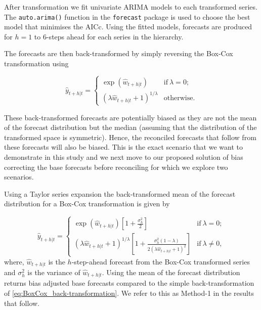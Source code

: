 \documentclass[12pt]{article}
\theoremstyle{definition}
\theoremstyle{property}
\begin{document}
After transformation we fit univariate ARIMA models to each transformed series. The \verb|auto.arima()| function in the \verb|forecast| package is used to choose the best model that minimises the AICc. Using the fitted models, forecasts are produced for $h=1$ to $6$-steps ahead for each series in the hierarchy.

The forecasts are then back-transformed by simply reversing the Box-Cox transformation using

\begin{equation} \label{eq:BoxCox_back-transformation}
	\hat{y}_{t+h|t} =
	\begin{cases}
	\exp({\hat{w}_{t+h|t}}) & \text{if}~\lambda = 0; \\
	(\lambda \hat{w}_{t+h|t} + 1)^{1/\lambda}  & \text{otherwise.}
	\end{cases}
\end{equation}

These back-transformed forecasts are potentially biased as they are not the mean of the forecast distribution but the median (assuming that the distribution of the transformed space is symmetric). Hence, the reconciled forecasts that follow from these forecasts will also be biased. This is the exact scenario that we want to demonstrate in this study and we next move to our proposed solution of bias correcting the base forecasts before reconciling for which we explore two scenarios.

Using a Taylor series expansion  the back-transformed mean of the forecast distribution for a Box-Cox transformation is given by

\begin{equation} \label{eq:BoxCox_BT_biasadj}
	 \hat{y}_{t+h|t} =
	\begin{cases}
	\exp({\hat{w}_{t+h|t}})[1+\frac{\sigma_h^2}{2}] & \text{if}~\lambda = 0; \\
	(\lambda \hat{w}_{t+h|t} + 1)^{1/\lambda}[1 + \frac{\sigma_h^2(1-\lambda)}{2(\lambda \hat{w}_{t+h|t} + 1)^2}]       & \text{if}~\lambda \ne 0,
	\end{cases}
	\end{equation}
where, $\hat{w}_{t+h|t}$ is the $h$-step-ahead forecast from the Box-Cox transformed series and $\sigma_h^2$ is the variance of $\hat{w}_{t+h|t}$. Using the mean of the forecast distribution returns bias adjusted base forecasts compared to the simple back-transformation of \eqref{eq:BoxCox_back-transformation}. We refer to this as Method-1 in the results that follow.
\end{document}
